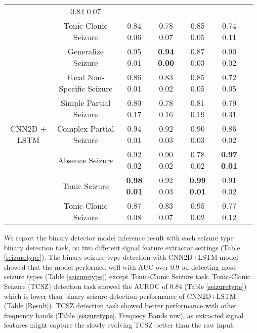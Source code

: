 \documentclass[pmlr,twocolumn,10pt]{jmlr}
\begin{document}
\begin{table*}[ht!]
\begin{tabular}{c|c|ccccc}
		& 0.84  0.07 
		\\
		&Tonic-Clonic Seizure 
		& 0.84  0.06 
		& 0.78  0.07 
		& 0.85  0.05 
		& 0.74  0.11 
		\\
		\midrule
		\multirow{7}{*}{CNN2D + LSTM}
		& Generalize Seizure 
		& 0.95  0.01
		& \textbf{0.94  0.00}
		& 0.87  0.03
		& 0.90  0.02 
		\\
		&Focal Non-Specific Seizure 
		& 0.86  0.01
		& 0.83  0.02 
		& 0.85  0.05 
		& 0.72  0.05 
		\\
		&Simple Partial Seizure 
		& 0.80  0.17 
		& 0.78  0.16
		& 0.81  0.19
		& 0.79  0.31
		\\
		&Complex Partial Seizure 
		& 0.94  0.01
		& 0.92  0.03
		& 0.90  0.03
		& 0.86  0.02
		\\
		(Frequency Bands)
		&Absence Seizure 
		& 0.92  0.02
		& 0.90  0.02
		& 0.78  0.02
		& \textbf{0.97  0.01}
		\\
		&Tonic Seizure 
		& \textbf{0.98  0.01} 
		& 0.92  0.03
		& \textbf{0.99  0.01}
		& 0.91  0.02
		\\
		&Tonic-Clonic Seizure 
		& 0.87  0.08
		& 0.83  0.07
		& 0.95  0.02
		& 0.77  0.12
		\\
		\bottomrule
	\end{tabular}
\end{table*} We report the binary detector model inference result with each seizure type binary detection task, on two different signal feature extractor settings (Table \ref{seizuretype}). The binary seizure type detection with CNN2D+LSTM model showed that the model performed well with AUC over 0.9 on detecting most seizure types (Table \ref{seizuretype}) except Tonic-Clonic Seizure task. Tonic-Clonic Seizure (TCSZ) detection task showed the AUROC of 0.84 (Table \ref{seizuretype}) which is lower than binary seizure detection performance of CNN2D+LSTM (Table \ref{Result}). TCSZ detection task showed better performance with other frequency bands (Table \ref{seizuretype}, Frequecy Bands row), as extracted signal features might capture the slowly evolving TCSZ better than the raw input. 
\end{document}
